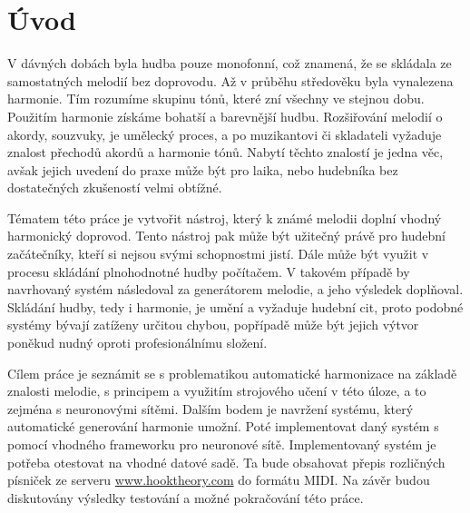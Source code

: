 \chapter{Úvod}
\label{uvod}

V dávných dobách byla hudba pouze monofonní, což znamená, 
že se skládala ze samostatných melodií bez doprovodu.
Až v průběhu středověku byla vynalezena harmonie.
Tím rozumíme skupinu tónů, které zní všechny ve stejnou dobu.
Použitím harmonie získáme bohatší a barevnější hudbu.
Rozšiřování melodií o akordy, souzvuky, je umělecký proces,
a po muzikantovi či skladateli vyžaduje znalost přechodů akordů a harmonie tónů.
Nabytí těchto znalostí je jedna věc, 
avšak jejich uvedení do praxe může být pro laika, 
nebo hudebníka bez dostatečných zkušeností velmi obtížné.
\par
Tématem této práce je vytvořit nástroj, 
který k známé melodii doplní vhodný harmonický doprovod.
Tento nástroj pak může být užitečný právě pro hudební začátečníky,
kteří si nejsou svými schopnostmi jistí. 
Dále může být využit v procesu skládání plnohodnotné hudby počítačem.
V takovém případě by navrhovaný systém následoval za generátorem melodie,
a jeho výsledek doplňoval.
Skládání hudby, tedy i harmonie, je umění a vyžaduje hudební cit,
proto podobné systémy bývají zatíženy určitou chybou, 
popřípadě může být jejich výtvor poněkud nudný oproti profesionálnímu složení.
\par
Cílem práce je seznámit se s problematikou automatické harmonizace na základě znalosti melodie,
s principem a využitím strojového učení v této úloze, a to zejména s neuronovými sítěmi.
Dalším bodem je navržení systému, který automatické generování harmonie umožní.
Poté implementovat daný systém s pomocí vhodného frameworku pro neuronové sítě.
Implementovaný systém je potřeba otestovat na vhodné datové sadě. 
Ta bude obsahovat přepis rozličných písniček ze serveru \url{www.hooktheory.com}
do formátu MIDI.
Na závěr budou diskutovány výsledky testování a možné pokračování této práce.

